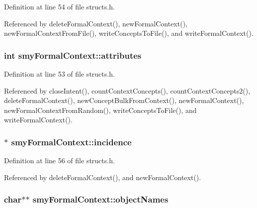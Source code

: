 \-Definition at line 54 of file structs.\-h.



\-Referenced by delete\-Formal\-Context(), new\-Formal\-Context(), new\-Formal\-Context\-From\-File(), write\-Concepts\-To\-File(), and write\-Formal\-Context().

\hypertarget{structsmyFormalContext_a4ae89e8f42fd7feab4db872cd8472b5e}{
\subsubsection[{attributes}]{\setlength{\rightskip}{0pt plus 5cm}int {\bf smy\-Formal\-Context\-::attributes}}}\label{structsmyFormalContext_a4ae89e8f42fd7feab4db872cd8472b5e}


\-Definition at line 53 of file structs.\-h.



\-Referenced by close\-Intent(), count\-Context\-Concepts(), count\-Context\-Concepts2(), delete\-Formal\-Context(), new\-Concept\-Bulk\-From\-Context(), new\-Formal\-Context(), new\-Formal\-Context\-From\-Random(), write\-Concepts\-To\-File(), and write\-Formal\-Context().

\hypertarget{structsmyFormalContext_a55d9d4c2e38c3571e9f6e870bc1c06b8}{
\subsubsection[{incidence}]{$\ast$ {\bf smy\-Formal\-Context\-::incidence}}}\label{structsmyFormalContext_a55d9d4c2e38c3571e9f6e870bc1c06b8}


\-Definition at line 56 of file structs.\-h.



\-Referenced by delete\-Formal\-Context(), and new\-Formal\-Context().

\hypertarget{structsmyFormalContext_a732a2615921f2d209fb7d9341df2c183}{
\subsubsection[{object\-Names}]{\setlength{\rightskip}{0pt plus 5cm}char$\ast$$\ast$ {\bf smy\-Formal\-Context\-::object\-Names}}}\label{structsmyFormalContext_a732a2615921f2d209fb7d9341df2c183}


